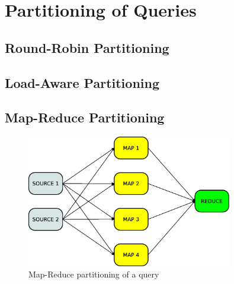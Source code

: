 \section{Partitioning of Queries}
\label{sec:qpart}
	\subsection{Round-Robin Partitioning}
	  
	\subsection{Load-Aware Partitioning}
	  
	\subsection{Map-Reduce Partitioning}
	
\begin{figure} 
	\centering	
	\includegraphics[width=0.8\textwidth]{img/tesi/map_reduce.eps}
	\caption{Map-Reduce partitioning of a query}
	\label{fig:mr-part}
\end{figure}
